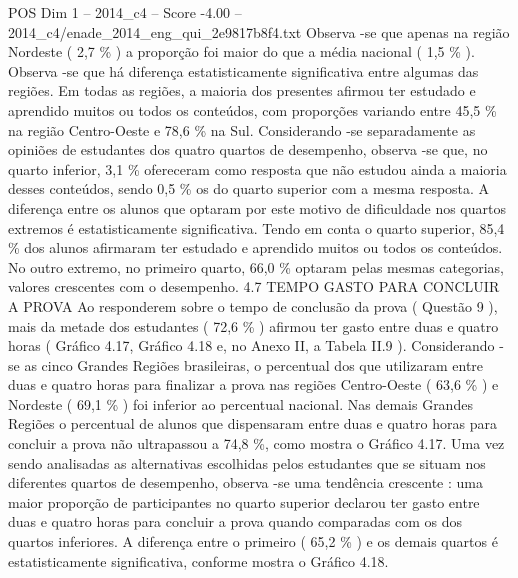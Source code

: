 \begin{textsample}{POS Dim 1 – 2014\_c4 – Score -4.00 – 2014\_c4/enade\_2014\_eng\_qui\_2e9817b8f4.txt}
Observa -se que apenas na região Nordeste ( 2,7 \% ) a proporção foi maior do que a média nacional ( 1,5 \% ).
Observa -se que há diferença estatisticamente significativa entre algumas das regiões.
Em todas as regiões, a maioria dos presentes afirmou ter estudado e aprendido muitos ou todos os conteúdos, com proporções variando entre 45,5 \% na região Centro-Oeste e 78,6 \% na Sul.
Considerando -se separadamente as opiniões de estudantes dos quatro quartos de desempenho, observa -se que, no quarto inferior, 3,1 \% ofereceram como resposta que não estudou ainda a maioria desses conteúdos, sendo 0,5 \% os do quarto superior com a mesma resposta.
A diferença entre os alunos que optaram por este motivo de dificuldade nos quartos extremos é estatisticamente significativa.
Tendo em conta o quarto superior, 85,4 \% dos alunos afirmaram ter estudado e aprendido muitos ou todos os conteúdos.
No outro extremo, no primeiro quarto, 66,0 \% optaram pelas mesmas categorias, valores crescentes com o desempenho. 4.7 TEMPO GASTO PARA CONCLUIR A PROVA Ao responderem sobre o tempo de conclusão da prova ( Questão 9 ), mais da metade dos estudantes ( 72,6 \% ) afirmou ter gasto entre duas e quatro horas ( Gráfico 4.17, Gráfico 4.18 e, no Anexo II, a Tabela II.9 ).
Considerando -se as cinco Grandes Regiões brasileiras, o percentual dos que utilizaram entre duas e quatro horas para finalizar a prova nas regiões Centro-Oeste ( 63,6 \% ) e Nordeste ( 69,1 \% ) foi inferior ao percentual nacional.
Nas demais Grandes Regiões o percentual de alunos que dispensaram entre duas e quatro horas para concluir a prova não ultrapassou a 74,8 \%, como mostra o Gráfico 4.17.
Uma vez sendo analisadas as alternativas escolhidas pelos estudantes que se situam nos diferentes quartos de desempenho, observa -se uma tendência crescente : uma maior proporção de participantes no quarto superior declarou ter gasto entre duas e quatro horas para concluir a prova quando comparadas com os dos quartos inferiores.
A diferença entre o primeiro ( 65,2 \% ) e os demais quartos é estatisticamente significativa, conforme mostra o Gráfico 4.18.

\end{textsample}

